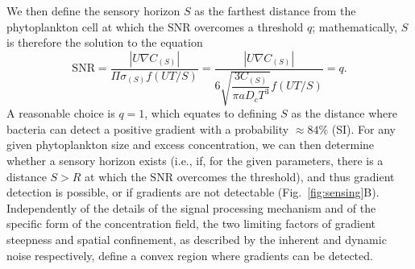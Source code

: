 \documentclass[9pt,twocolumn,twoside]{pnas-new}
\newcommand{\SNR}{\mathrm{SNR}}
\providecommand{\DIFaddbegin}{} %
\providecommand{\DIFaddend}{} %
\providecommand{\DIFdelbegin}{} %
\providecommand{\DIFdelend}{} %
\begin{document}
We then define the sensory horizon $S$ as the farthest distance from the phytoplankton cell at which the $\SNR$ overcomes a threshold $q$; mathematically, $S$ is therefore the solution to the equation
\begin{equation}
  \SNR = \DIFdelbegin %
\DIFdelend \DIFaddbegin \dfrac{|U\nabla C_{(S)}|}{\Pi\sigma_{(S)}f(UT/S)} \DIFaddend =
    \DIFdelbegin %
\DIFdelend \DIFaddbegin \dfrac{|U\nabla C_{(S)}|}{6\sqrt{\dfrac{3C_{(S)}}{\pi a D_c T^3}}f(UT/S)} \DIFaddend = q.
\end{equation}
A reasonable choice is $q=1$, which equates to defining $S$ as the distance where bacteria can detect a positive gradient with a probability $\approx 84\%$ (SI).
For any given phytoplankton size and excess concentration, we can then determine whether a sensory horizon exists (i.e., if, for the given parameters, there is a distance $S>R$ at which the $\SNR$ overcomes the threshold), and thus gradient detection is possible, or if gradients are not detectable (Fig.~\ref{fig:sensing}B).
Independently of the details of the signal processing mechanism and of the specific form of the concentration field, the two limiting factors of gradient steepness and spatial confinement, as described by the inherent and dynamic noise respectively, define a convex region where gradients can be detected.
\end{document}
